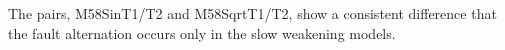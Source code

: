 

The pairs, M58SinT1/T2 and M58SqrtT1/T2, show a consistent difference that the fault alternation occurs only in the slow weakening models.




